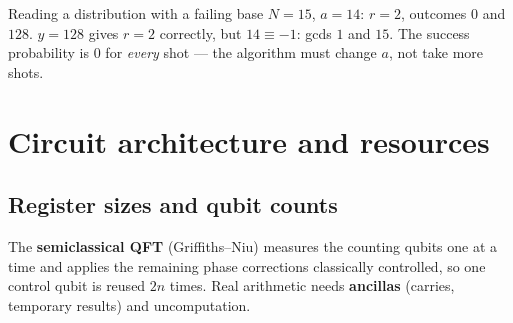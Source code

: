 \documentclass[11pt,a4paper,openany]{book}
\newcounter{wex}[chapter]
\begin{document}
\begin{wexample}{Reading a distribution with a failing base}
$N = 15$, $a = 14$: $r = 2$, outcomes $0$ and $128$. $y = 128$ gives $r = 2$ correctly, but $14 \equiv -1$: gcds $1$ and $15$. The success probability is $0$ for
\emph{every} shot --- the algorithm must change $a$, not take more shots.
\end{wexample}

\section{Circuit architecture and resources}
\subsection{Register sizes and qubit counts}
\begin{center}
\end{center}
The \textbf{semiclassical QFT} (Griffiths--Niu) measures the counting qubits one at a time and applies the remaining phase corrections classically
controlled, so one control qubit is reused $2n$ times. Real arithmetic needs \textbf{ancillas} (carries, temporary results) and uncomputation.
\end{document}
